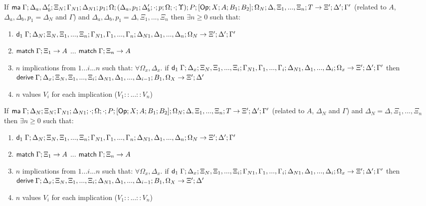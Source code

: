 \begin{theorem}
   If $\mathsf{ma} \; \Gamma; \Delta_a, \Delta'_b; \Xi_N; \Gamma_{N1}; \Delta_{N1}; p_1; \Omega; (\Delta_a, p_1; \Delta'_b; \cdot; p; \Omega; \cdot; \Upsilon); P; [\mathsf{Op} ; X ; A ; B_1; B_2]; \Omega_N; \Delta, \Xi_1, ..., \Xi_n; T \rightarrow \Xi'; \Delta'; \Gamma'$ (related to $A$, $\Delta_a, \Delta_b, p_1 = \Delta_N$ and $\Gamma$) and $\Delta_a, \Delta_b, p_1 = \Delta, \Xi_1, ..., \Xi_n$  then $\exists n \geq 0$ such that:
   
   \begin{enumerate}
      \item $\mathsf{d}_1 \; \Gamma; \Delta_N; \Xi_N, \Xi_1, ..., \Xi_n; \Gamma_{N1}, \Gamma_1, ..., \Gamma_n; \Delta_{N1}, \Delta_1, ..., \Delta_n; \Omega_N \rightarrow \Xi'; \Delta'; \Gamma'$
      \item $\mathsf{match} \; \Gamma; \Xi_1 \rightarrow A$ ... $\mathsf{match} \; \Gamma; \Xi_n \rightarrow A$
      \item $n$ implications from $1...i...n$ such that: $\forall \Omega_x, \Delta_x.$ if $\mathsf{d}_1 \; \Gamma; \Delta_x; \Xi_N, \Xi_1, ..., \Xi_i; \Gamma_{N1}, \Gamma_1, ..., \Gamma_i; \Delta_{N1}, \Delta_1, ..., \Delta_i; \Omega_x \rightarrow \Xi'; \Delta'; \Gamma'$ then $\mathsf{derive} \; \Gamma; \Delta_x; \Xi_N, \Xi_1, ..., \Xi_i; \Delta_{N1}, \Delta_1, ..., \Delta_{i-1}; B_1, \Omega_X \rightarrow \Xi'; \Delta'$
      \item $n$ values $V_i$ for each implication ($V_1 :: ... :: V_n$)
   \end{enumerate}
   
   If $\mathsf{ma} \; \Gamma; \Delta_N; \Xi_N; \Gamma_{N1}; \Delta_{N1}; \cdot; \Omega; \cdot; P; [\mathsf{Op} ; X ; A ; B_1; B_2]; \Omega_N; \Delta, \Xi_1, ..., \Xi_n; T \rightarrow \Xi'; \Delta'; \Gamma'$ (related to $A$, $\Delta_N$ and $\Gamma$) and $\Delta_N = \Delta, \Xi_1, ..., \Xi_n$ then $\exists n \geq 0$ such that:
   
   \begin{enumerate}
      \item $\mathsf{d}_1 \; \Gamma; \Delta_N; \Xi_N, \Xi_1, ..., \Xi_n; \Gamma_{N1}, \Gamma_1, ..., \Gamma_n; \Delta_{N1}, \Delta_1, ..., \Delta_n; \Omega_N \rightarrow \Xi'; \Delta'; \Gamma'$
      \item $\mathsf{match} \; \Gamma; \Xi_1 \rightarrow A$ ... $\mathsf{match} \; \Gamma; \Xi_n \rightarrow A$
      \item $n$ implications from $1...i...n$ such that: $\forall \Omega_x, \Delta_x.$ if $\mathsf{d}_1 \; \Gamma; \Delta_x; \Xi_N, \Xi_1, ..., \Xi_i; \Gamma_{N1}, \Gamma_1, ..., \Gamma_i; \Delta_{N1}, \Delta_1, ..., \Delta_i; \Omega_x \rightarrow \Xi'; \Delta'; \Gamma'$ then $\mathsf{derive} \; \Gamma; \Delta_x; \Xi_N, \Xi_1, ..., \Xi_i; \Delta_{N1}, \Delta_1, ..., \Delta_{i-1}; B_1, \Omega_X \rightarrow \Xi'; \Delta'$
      \item $n$ values $V_i$ for each implication ($V_1 :: ... :: V_n$)
   \end{enumerate}
\end{theorem}

